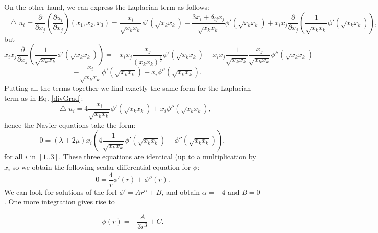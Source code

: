 \documentclass[DIV=12]{article}
\newcommand*\Laplace{\mathop{}\!\mathbin\bigtriangleup}
\begin{document}
On the other hand, we can express the Laplacian term as follows:
\begin{equation}
\Laplace u_i = \frac{\partial}{\partial x_j}\left(\frac{\partial u_i}{\partial x_j}  \right)( x_1,x_2, x_3 ) = \frac{x_i}{\sqrt{x_k x_k}} \phi'( \sqrt{x_k x_k} ) + \frac{ 3 x_i + \delta_{ij} x_j}{ \sqrt{x_k x_k} } \phi'( \sqrt{x_k x_k} ) + x_i x_j \frac{\partial}{\partial x_j}\left(  \frac{1}{\sqrt{x_k x_k}}  \phi'( \sqrt{x_k x_k})\right),
\end{equation}
but 
\begin{equation}
 x_i x_j  \frac{\partial}{\partial x_j}\left(  \frac{1}{\sqrt{x_k x_k}}  \phi'( \sqrt{x_k x_k})\right) = - x_i x_j \frac{x_j}{ (x_k x_k )^{\frac{3}{2}}} \phi'( \sqrt{x_k x_k})
 + x_i x_j   \frac{1}{\sqrt{x_k x_k}}\frac{x_j}{\sqrt{x_k x_k}}\phi''( \sqrt{x_k x_k} )
\end{equation}
\begin{equation}
=- \frac{x_i}{\sqrt{x_k x_k}}  \phi'( \sqrt{x_k x_k})+ x_i\phi''( \sqrt{x_k x_k} ).
\end{equation}
Putting all the terms together we find exactly the same form for the Laplacian term as in Eq. \ref{divGrad}:
\begin{equation}
 \Laplace u_i = 4\frac{x_i }{ \sqrt{x_k x_k} } \phi'( \sqrt{x_k x_k} ) +  x_i\phi''( \sqrt{x_k x_k}),
\end{equation}
hence the Navier equations take the form:
\begin{equation}
0 = (\lambda + 2\mu) x_i \left( 4\frac{1 }{ \sqrt{x_k x_k} } \phi'( \sqrt{x_k x_k} ) + \phi''( \sqrt{x_k x_k} ) \right),
\end{equation}
 for all $i$ in $[1..3]$. These three equations are identical (up to a multiplication by $x_i$ so we obtain the following scalar differential equation 
 for $\phi$:
\begin{equation}
0 = \frac{4}{r}\phi'(r) + \phi''( r ).
\end{equation}
We can look for solutions of the forl $\phi' = A r^{\alpha} + B$, and obtain $\alpha = -4$ and $B=0$. One more integration 
 gives rise to 

\begin{equation}
\boxed{\phi( r ) = -\frac{A}{3 r^3}+C.}
\end{equation}
\end{document}
